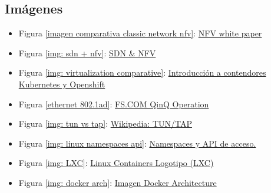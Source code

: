 \documentclass[a4paper, oneside, 12pt]{book}
\begin{document}
	\subsection*{Imágenes}
	\begin{itemize}
		\item Figura \ref{imagen comparativa classic network nfv}:
		\label{img: nfv vs classic}
		\href{https://portal.etsi.org/nfv/nfv_white_paper.pdf}{NFV white paper}
		
		
		\item Figura \ref{img: sdn + nfv}:
		\label{img: sdn vs nfv osi}
		\href{https://comparacloud.com/servicios-clouds/sdn-y-nfv/}{SDN \& NFV}
		
		\item Figura \ref{img: virtualization comparative}: 
		\label{img: vm vs container}
		\href{https://github.com/mgarzago/CodeAndNotes/wiki/Introducci%C3%B3n-a-Contenedores%2C-Kubernetes-y-Openshift}{Introducción a contendores Kubernetes y Openshift}
		
		\item Figura \ref{ethernet 802.1ad}:
		\label{img: frame ethernet 802.1ad}
		\href{https://img-en.fs.com/file/user_manual/s3800-series-qinq-operation.pdf}{FS.COM QinQ Operation}
		
		\item Figura \ref{img: tun vs tap}: 
		\label{bib_img: tun tap}
		\href{https://en.wikipedia.org/wiki/TUN/TAP}{Wikipedia: TUN/TAP}
		
		\item Figura \ref{img: linux namespaces api}:
		\label{bib:img1}\href{https://8gwifi.org/docs/linux-namespace.jsp}{Namespaces y API de acceso.}
		
		
		
		\item Figura \ref{img: LXC}:
		\label{bib_img: lxc logo}
		\href{https://linuxcontainers.org/}{Linux Containers Logotipo (LXC)}
		
		\item Figura \ref{img: docker arch}:
		\label{bib_img: docker arch}
		\href{https://docs.docker.com/get-started/overview/}{Imagen Docker Architecture}
		

\end{itemize}
\end{document}
